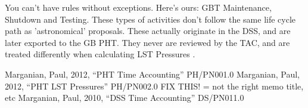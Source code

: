 \documentclass{article}
\begin{document}
You can't have rules without exceptions.  Here's ours:  GBT Maintenance,
Shutdown and Testing.  These types of activities don't follow the same life
cycle path as 'astronomical' proposals.  These actually originate in the DSS,
and are later exported to the GB PHT.  They never are reviewed by the TAC, and
are treated differently when calculating LST Pressures \cite{marganian12b}.


\begin{thebibliography}{}
  Marganian, Paul, 2012, ``PHT Time Accounting''
  PH/PN001.0
  Marganian, Paul, 2012, ``PHT LST Pressures''
  PH/PN002.0
FIX THIS! = not the right memo title, etc
  Marganian, Paul, 2010, ``DSS Time Accounting''
  DS/PN011.0
\end{thebibliography}{}
\end{document}
